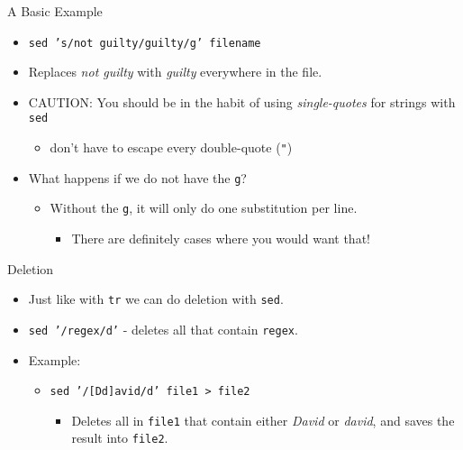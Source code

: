 \begin{frame}[fragile]{A Basic Example}
  \begin{itemize}[<+- | alert@+>]
    \item[] \hspace*{-3ex}\texttt{sed 's/not guilty/guilty/g' filename}
    \item Replaces \emph{not guilty} with \emph{guilty} everywhere in the file.
    \item CAUTION: You should be in the habit of using \emph{single-quotes} for strings with \texttt{sed}
    \begin{itemize}[<+- | alert@+>]
      \item don't have to escape every double-quote (\texttt{"})
    \end{itemize}
    \item What happens if we do not have the \texttt{g}?
    \begin{itemize}[<+- | alert@+>]
      \item Without the \texttt{g}, it will only do one substitution per line.
      \begin{itemize}[<+- | alert@+>]
        \item There are definitely cases where you would want that!
      \end{itemize}
    \end{itemize}
  \end{itemize}
\end{frame}

\begin{frame}[fragile]{Deletion}
  \begin{itemize}[<+- | alert@+>]
    \item Just like with \texttt{tr} we can do deletion with \texttt{sed}.
    \item \texttt{sed '/regex/d'} \-- deletes all  that contain \texttt{regex}.
    \item Example:
    \begin{itemize}[<+- | alert@+>]
      \item \texttt{sed '/[Dd]avid/d' file1 > file2}
      \begin{itemize}[<+- | alert@+>]
        \item Deletes all  in \texttt{file1} that contain either \emph{David} or \emph{david}, and
              saves the result into \texttt{file2}.
      \end{itemize}
    \end{itemize}
  \end{itemize}
\end{frame}

